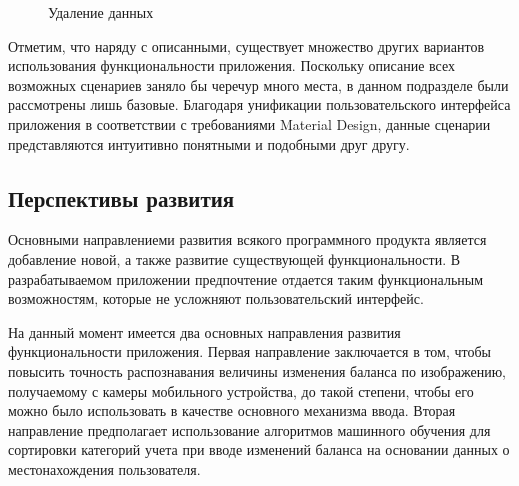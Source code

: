 \begin{figure}[h!]
  \centering
  \caption{Удаление данных}
  \label{fig:implementation_manual_remove}
\end{figure}

Отметим, что наряду с описанными, существует множество других вариантов
использования функциональности приложения.
Поскольку описание всех возможных сценариев заняло бы
черечур много места, в данном подразделе были рассмотрены лишь базовые.
Благодаря унификации пользовательского интерфейса приложения
в соответствии с требованиями Material Design, данные сценарии представляются
интуитивно понятными и подобными друг другу.

\subsection{Перспективы развития}

Основными направлениеми развития всякого программного продукта является
добавление новой, а также развитие существующей функциональности.
В разрабатываемом приложении предпочтение отдается таким функциональным
возможностям, которые не усложняют пользовательский интерфейс.

На данный момент имеется два основных направления развития функциональности приложения.
Первая направление заключается в том, чтобы повысить точность распознавания величины
изменения баланса по изображению, получаемому с камеры мобильного устройства,
до такой степени, чтобы его можно было использовать в качестве основного механизма ввода.
Вторая направление предполагает использование алгоритмов машинного обучения
для сортировки категорий учета при вводе изменений баланса на основании
данных о местонахождения пользователя.
